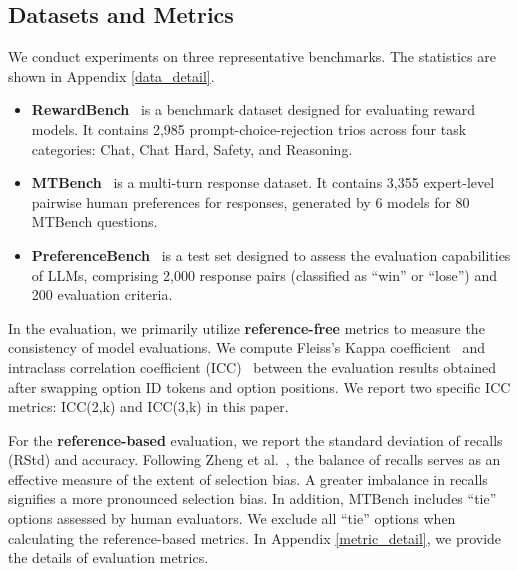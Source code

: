 \documentclass[sigconf]{acmart}
\begin{document}
\subsection{Datasets and Metrics}
We conduct experiments on three representative benchmarks. The statistics are shown in Appendix \ref{data_detail}.
\begin{itemize}[leftmargin=*]
    \item \textbf{RewardBench}~\cite{lambert2024rewardbench} is a benchmark dataset designed for evaluating reward models. It contains 2,985 prompt-choice-rejection trios across four task categories: Chat, Chat Hard, Safety, and Reasoning.
    \item \textbf{MTBench}~\cite{zheng2023judging} is a multi-turn response dataset. It contains 3,355 expert-level pairwise human preferences for responses, generated by 6 models for 80 MTBench questions.
    \item \textbf{PreferenceBench}~\cite{kim2024prometheus} is a test set designed to assess the evaluation capabilities of LLMs, comprising 2,000 response pairs (classified as ``win'' or ``lose'') and 200 evaluation criteria.
\end{itemize}

In the evaluation, we primarily utilize \textbf{reference-free} metrics to measure the consistency of model evaluations. We compute Fleiss's Kappa coefficient~\cite{falotico2015fleiss} and intraclass correlation coefficient (ICC)~\cite{bartko1966intraclass} between the evaluation results obtained after swapping option ID tokens and option positions. We report two specific ICC metrics: ICC(2,k) and ICC(3,k) in this paper.

For the \textbf{reference-based} evaluation, we report the standard deviation of recalls (RStd) and accuracy. Following Zheng et al.~\cite{zheng2023large}, the balance of recalls serves as an effective measure of the extent of selection bias. A greater imbalance in recalls signifies a more pronounced selection bias. In addition, MTBench includes ``tie'' options assessed by human evaluators. We exclude all ``tie'' options when calculating the reference-based metrics.
In Appendix \ref{metric_detail}, we provide the details of evaluation metrics.



\end{document}
